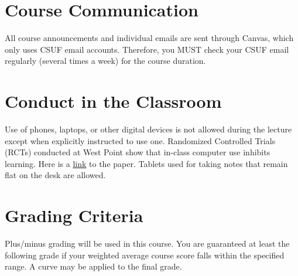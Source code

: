 \documentclass{./../Latex/syllabus}
\begin{document}
\section*{Course Communication}
All course announcements and individual emails are sent through Canvas, which only uses CSUF email accounts. Therefore, you MUST check your CSUF email regularly (several times a week) for the course duration.

\section*{Conduct in the Classroom}
Use of phones, laptops, or other digital devices is not allowed during the lecture except when explicitly instructed to use one. Randomized Controlled Trials (RCTs) conducted at West Point show that in-class computer use inhibits learning. Here is a \href{https://oema.army.mil/pub/2017_Carter_Greenberg_Walker_Computer_Usage_RCT_USMA.pdf}{link} to the paper. Tablets used for taking notes that remain flat on the desk are allowed.

\section*{Grading Criteria}

Plus/minus grading will be used in this course. You are guaranteed at least the following grade if your weighted average course score falls within the specified range. A curve may be applied to the final grade.
\end{document}

